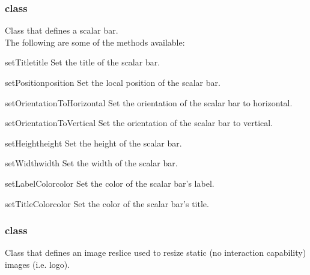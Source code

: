 \subsubsection{\ScalarBar class}
Class that defines a scalar bar. \\

The following are some of the methods available:

\begin{methoddesc}[ScalarBar]{setTitle}{title}
Set the title of the scalar bar.
\end{methoddesc}

\begin{methoddesc}[ScalarBar]{setPosition}{position}
Set the local position of the scalar bar.
\end{methoddesc}

\begin{methoddesc}[ScalarBar]{setOrientationToHorizontal}{}
Set the orientation of the scalar bar to horizontal.
\end{methoddesc}

\begin{methoddesc}[ScalarBar]{setOrientationToVertical}{}
Set the orientation of the scalar bar to vertical.
\end{methoddesc}

\begin{methoddesc}[ScalarBar]{setHeight}{height}
Set the height of the scalar bar.
\end{methoddesc}

\begin{methoddesc}[ScalarBar]{setWidth}{width}
Set the width of the scalar bar.
\end{methoddesc}

\begin{methoddesc}[ScalarBar]{setLabelColor}{color}
Set the color of the scalar bar's label.
\end{methoddesc}

\begin{methoddesc}[ScalarBar]{setTitleColor}{color}
Set the color of the scalar bar's title.
\end{methoddesc}

\subsubsection{\ImageReslice class}
Class that defines an image reslice used to resize static
(no interaction capability) images (i.e. logo). \\

